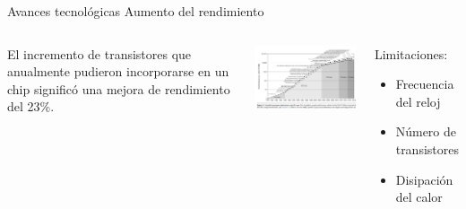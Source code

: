 \documentclass[aspectratio=169,compress]{beamer}
\begin{document}
\begin{frame} {Avances tecnológicas} {Aumento del rendimiento}

    \begin{columns}[onlytextwidth,T]
    \column{\dimexpr\linewidth-40mm-5mm}

	\begin{itemize}
	\end{itemize}
\bigskip
    \includegraphics[width=90mm]{images/spec.jpg}

      \column{60mm}
	\begin{footnotesize}
Limitaciones:
\begin{itemize}
\item Frecuencia del reloj
\item Número de transistores
\item Disipación del calor
\end{itemize}

	\end{footnotesize}

    \end{columns}

\end{frame}
\end{document}
